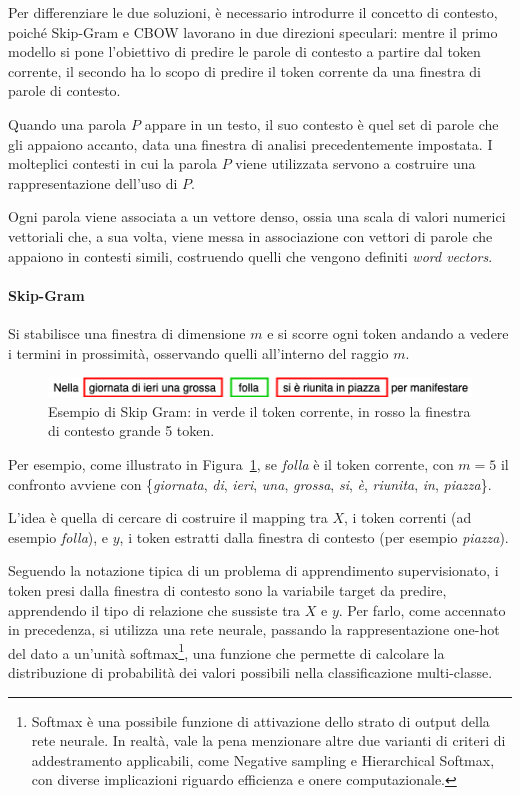 \documentclass[12pt]{report}
\theoremstyle{definition}
\begin{document}
Per differenziare le due soluzioni, è necessario introdurre il concetto di contesto, poiché Skip-Gram e CBOW lavorano in due direzioni speculari:
mentre il primo modello si pone l'obiettivo di predire le parole di contesto a partire dal token corrente, il secondo ha lo scopo di predire il token corrente da una finestra di parole di contesto.

Quando una parola $P$ appare in un testo, il suo contesto è quel set di parole che gli appaiono accanto, data una finestra di analisi precedentemente impostata. I molteplici contesti in cui la parola $P$ viene utilizzata servono a costruire una rappresentazione dell’uso di $P$.

Ogni parola viene associata a un vettore denso, ossia una scala di valori numerici vettoriali che, a sua volta, viene messa in associazione con vettori di parole che appaiono in contesti simili, costruendo quelli che vengono definiti \textit{word vectors}.

\paragraph{Skip-Gram}
Si stabilisce una finestra di dimensione $m$ e si scorre ogni token andando a vedere i termini in prossimità, osservando quelli all'interno del raggio $m$.
\begin{figure}
    \centering
    \includegraphics[scale = 0.7]{images/skip-gram.png}
    \caption{Esempio di Skip Gram: in verde il token corrente, in rosso la finestra di contesto grande 5 token.}
    \label{skipgram}
\end{figure}
Per esempio, come illustrato in Figura~\ref{skipgram}, se \textit{folla} è il token corrente, con $m = 5$ il confronto avviene con \{\textit{giornata}, \textit{di}, \textit{ieri}, \textit{una}, \textit{grossa}, \textit{si}, \textit{è}, \textit{riunita}, \textit{in}, \textit{piazza}\}.

L'idea è quella di cercare di costruire il mapping tra $X$, i token correnti (ad esempio \textit{folla}), e $y$, i token estratti dalla finestra di contesto (per esempio \textit{piazza}).

Seguendo la notazione tipica di un problema di apprendimento supervisionato, i token presi dalla finestra di contesto sono la variabile target da predire, apprendendo il tipo di relazione che sussiste tra  $X$ e $y$.
Per farlo, come accennato in precedenza, si utilizza una rete neurale, passando la rappresentazione one-hot del dato a un'unità softmax\footnote{Softmax è una possibile funzione di attivazione dello strato di output della rete neurale. In realtà, vale la pena menzionare altre due varianti di criteri di addestramento applicabili, come Negative sampling e Hierarchical Softmax, con diverse implicazioni riguardo efficienza e onere computazionale.}, una funzione che permette di calcolare la distribuzione di probabilità dei valori possibili nella classificazione multi-classe.
\end{document}
